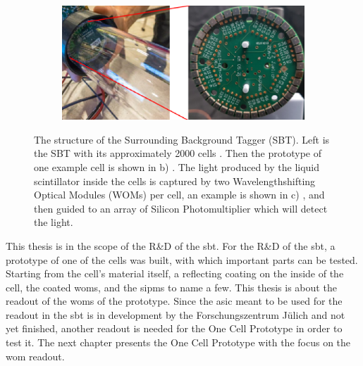 \begin{figure}
\begin{subfigure}[b]{0.24\textwidth}
		\caption{}
		\label{fig:sbt_structure_cell}
	\end{subfigure}
	\begin{subfigure}[b]{0.42\textwidth}
		\centering
		\includegraphics[width=1.\textwidth]{pictures/sbt_structure_wom}
		\caption{}
		\label{fig:sbt_structure}
	\end{subfigure}
	\caption[Overview of the Surrounding Background Tagger]{The structure of the Surrounding Background Tagger (SBT). Left is the SBT with its approximately 2000 cells \cite{}. Then the prototype of one example cell is shown in b) \cite{}. The light produced by the liquid scintillator inside the cells is captured by two Wavelengthshifting Optical Modules (WOMs) per cell, an example is shown in c) \cite{}, and then guided to an array of Silicon Photomultiplier which will detect the light.}
 	\label{fig:sbt}
\end{figure}

This thesis is in the scope of the R\&D of the \ac{sbt}.
For the R\&D of the \ac{sbt}, a prototype of one of the cells was built, with which important parts can be tested.
Starting from the cell's material itself, a reflecting coating on the inside of the cell, the coated \acp{wom}, and the \acp{sipm} to name a few.
This thesis is about the readout of the \acp{wom} of the prototype.
Since the \ac{asic} meant to be used for the readout in the \ac{sbt} is in development by the Forschungszentrum Jülich and not yet finished, another readout is needed for the One Cell Prototype in order to test it.
The next chapter presents the One Cell Prototype with the focus on the \ac{wom} readout.
